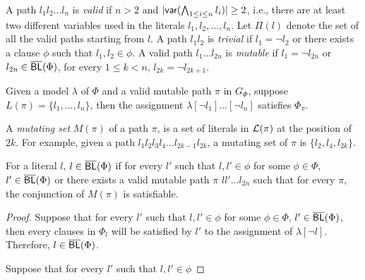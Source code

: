 A path $l_1l_2...l_n$ is \emph{valid} if $n>2$ and $|\textsf{var}(\bigwedge_{1\leq i\leq n} l_i)|\geq 2$, i.e., there are at least two different variables used in
the literals  $l_1,l_2,...,l_n$. Let $\Pi(l)$ denote the set of all the valid paths starting from $l$.
A path $l_1l_2$ is \emph{trivial} if $l_1=\neg l_2$ or there exists a clause $\phi$ such that $l_1,l_2\in\phi$.
A valid path $l_1...l_{2n}$ is \emph{mutable} if $l_1=\neg l_{2n}$ or $l_{2n}\in\overline{\textsf{BL}}(\Phi)$, for every $1\leq k < n$, $l_{2k}=\neg l_{2k+1}$.

\begin{proposition}
Given a model $\lambda$ of $\Phi$ and a valid mutable path $\pi$ in $G_\Phi$,
suppose $L(\pi)=\{l_1,...,l_n\}$,  then the assignment $\lambda[\neg l_1]...[\neg l_n]$ satisfies $\Phi_\pi$.
\end{proposition}

 A \emph{mutating set} $M(\pi)$ of a path $\pi$, is a set of literals in ${\cal L}(\pi)$ at the position of $2k$. For example, given a path $l_1l_2l_3l_4...l_{2k-1}l_{2k}$, a mutating set of $\pi$ is $\{l_2, l_4, l_{2k}\}$.
 
 For a literal $l$, $l\in\overline{\textsf{BL}}(\Phi)$ if for every $l'$ such that $l,l'\in\phi$ for some $\phi\in\Phi$, $l'\in\overline{\textsf{BL}}(\Phi)$ or there exists a valid mutable path $\pi$ $ll'...l_{2n}$ such that for every $\pi$, the conjunction of $M(\pi)$ is satisfiable.
 
 \begin{proof}
 Suppose that for every $l'$ such that $l,l'\in\phi$ for some $\phi\in\Phi$, $l'\in\overline{\textsf{BL}}(\Phi)$, then every clauses in $\Phi_l$ will be satisfied by $l'$ to the assignment of $\lambda[\neg l]$. Therefore, $l\in\overline{\textsf{BL}}(\Phi)$.
 
 Suppose that for every $l'$ such that $l,l'\in\phi$
 \end{proof}







